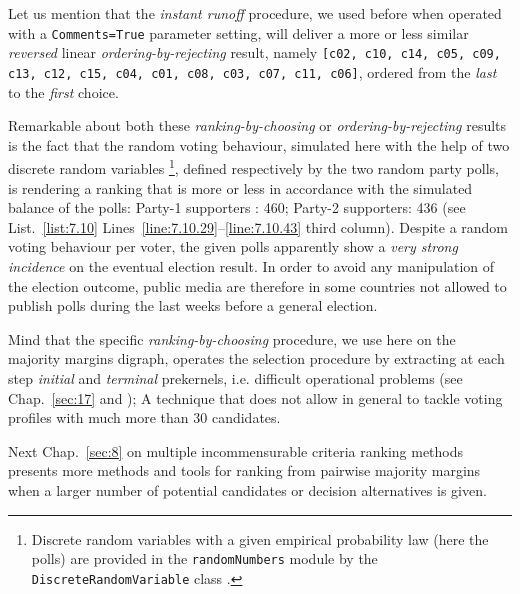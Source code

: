Let us mention that the \emph{instant runoff} procedure, we used before when operated with a \texttt{Comments=True} parameter setting, will deliver a more or less similar \emph{reversed} linear \emph{ordering-by-rejecting} result, namely \texttt{[c02, c10, c14, c05, c09, c13, c12, c15, c04, c01, c08, c03, c07, c11, c06]}, ordered from the \emph{last} to the \emph{first} choice.

Remarkable about both these \emph{ranking-by-choosing} or \emph{ordering-by-rejecting} results is the fact that the random voting behaviour, simulated here with the help of two discrete random variables \footnote{Discrete random variables with a given empirical probability law (here the polls) are provided in the \texttt{randomNumbers} module by the \texttt{DiscreteRandomVariable} class \citep{CPSTAT-L4}.}, defined respectively by the two random party polls, is rendering a ranking that is more or less in accordance with the simulated balance of the polls: Party-1 supporters : 460;  Party-2 supporters: 436 (see List.~\vref{list:7.10} Lines~\ref{line:7.10.29}--\ref{line:7.10.43} third column). Despite a random voting behaviour per voter, the given polls apparently show a \emph{very strong incidence} on the eventual election result. In order to avoid any manipulation of the election outcome, public media are therefore in some countries not allowed to publish polls during the last weeks before a general election.

Mind that the specific \emph{ranking-by-choosing} procedure, we use here on the majority margins digraph, operates the selection procedure by extracting at each step \emph{initial} and \emph{terminal} prekernels, i.e. difficult operational problems (see Chap.~\ref{sec:17} and \citealp{BIS-1999}); A technique that does not allow in general to tackle voting profiles with much more than 30 candidates.

\vspace{\baselineskip}

Next Chap.~\ref{sec:8} on multiple incommensurable criteria ranking methods presents more methods and tools for ranking from pairwise majority margins when a larger number of potential candidates or decision alternatives is given.  


%
%
